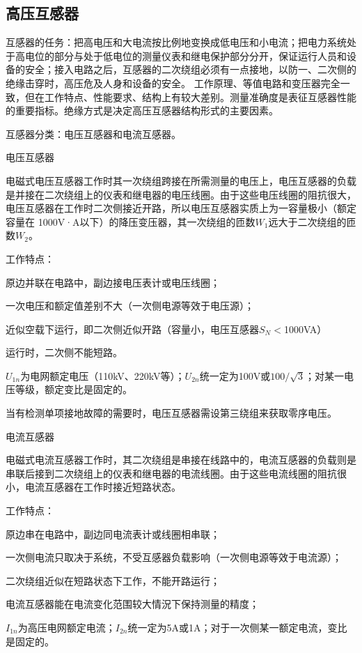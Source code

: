 \documentclass[UTF8, 12pt, a4paper]{ctexart}
\begin{document}
\subsection{高压互感器}
互感器的任务：把高电压和大电流按比例地变换成低电压和小电流；把电力系统处于高电位的部分与处于低电位的测量仪表和继电保护部分分开，保证运行人员和设备的安全；接入电路之后，互感器的二次绕组必须有一点接地，以防一、二次侧的绝缘击穿时，高压危及人身和设备的安全。
工作原理、等值电路和变压器完全一致，但在工作特点、性能要求、结构上有较大差别。测量准确度是表征互感器性能的重要指标。绝缘方式是决定高压互感器结构形式的主要因素。

互感器分类：电压互感器和电流互感器。

电压互感器

电磁式电压互感器工作时其一次绕组跨接在所需测量的电压上，电压互感器的负载是并接在二次绕组上的仪表和继电器的电压线圈。由于这些电压线圈的阻抗很大，电压互感器在工作时二次侧接近开路，所以电压互感器实质上为一容量极小（额定容量在 1000V·A以下）的降压变压器，其一次绕组的匝数$W_1$远大于二次绕组的匝数$W_2$。

工作特点：

原边并联在电路中，副边接电压表计或电压线圈；

一次电压和额定值差别不大（一次侧电源等效于电压源）；

近似空载下运行，即二次侧近似开路（容量小，电压互感器$S_N<$1000VA）

运行时，二次侧不能短路。

$U_{1n}$为电网额定电压（110kV、220kV等）；$U_{2n}$统一定为100V或$100 / \sqrt{3}$；对某一电压等级，额定变比是固定的。

当有检测单项接地故障的需要时，电压互感器需设第三绕组来获取零序电压。

电流互感器

电磁式电流互感器工作时，其二次绕组是串接在线路中的，电流互感器的负载则是串联后接到二次绕组上的仪表和继电器的电流线圈。由于这些电流线圈的阻抗很小，电流互感器在工作时接近短路状态。

工作特点：

原边串在电路中，副边同电流表计或线圈相串联；

一次侧电流只取决于系统，不受互感器负载影响（一次侧电源等效于电流源）；

二次绕组近似在短路状态下工作，不能开路运行；

电流互感器能在电流变化范围较大情況下保持测量的精度；

$I_{1n}$为高压电网额定电流；$I_{2n}$统一定为5A或1A；对于一次侧某一额定电流，变比是固定的。
\end{document}
